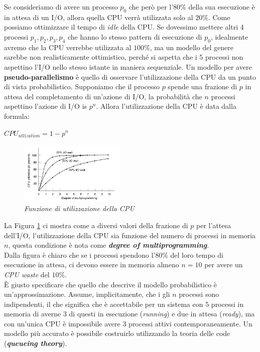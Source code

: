 Se consideriamo di avere un processo $p_0$ che però per l'$80\%$ della sua esecuzione è in attesa di un I/O, allora quella CPU verrà utilizzata solo al $20\%$. Come possiamo ottimizzare il tempo di \textit{idle} della CPU. Se dovessimo mettere altri 4 processi $p_1, p_2, p_3, p_4$ che hanno lo stesso pattern di esecuzione di $p_0$, idealmente avremo che la CPU verrebbe utilizzata al $100\%$, ma un modello del genere sarebbe non realisticamente ottimistico, perché si aspetta che i 5 processi non aspettino l'I/O nello stesso istante in maniera sequenziale. Un modello per avere \textbf{pseudo-parallelismo} è quello di osservare l'utilizzazione della CPU da un punto di vista probabilistico. Supponiamo che il processo $p$ spende una frazione di $p$ in attesa del completamento di un'azione di I/O, la probabilità che $n$ processi aspettino l'azione di I/O is $p^n$. Allora l'utilizzazione della CPU è data dalla formula:
\begin{center}
    $CPU_{utlization} = 1 - p^n$
\end{center}

\begin{figure}[h]
    \centering
    \includegraphics[width=0.45\textwidth]{img/deg_multiprog}
    \caption{\textit{Funzione di utilizzazione della CPU}}
    \label{fig:deg_multip}
\end{figure}

La Figura \ref{fig:deg_multip} ci mostra come a diversi valori della frazione di $p$ per l'attesa dell'I/O, l'utilizzazione della CPU sia funzione del numero di processi in memoria $n$, questa condizione è nota come \textbf{\textit{degree of multiprogramming}}. \\
Dalla figura è chiaro che se i processi spendono l'$80\%$ del loro tempo di esecuzione in attesa, ci devono essere in memoria almeno $n=10$ per avere un \textit{CPU waste} del $10\%$. \\
È giusto specificare che quello che descrive il modello probabilistico è un'approssimazione. Assume, implicitamente, che i gli $n$ processi sono indipendenti, il che significa che è accettabile per un sistema con 5 processi in memoria di averne 3 di questi in esecuzione (\textit{running}) e due in attesa (\textit{ready}), ma con un'unica CPU è impossibile avere 3 processi attivi contemporaneamente. Un modello più accurato è possibile costruirlo utilizzando la teoria delle code (\textbf{\textit{queueing theory}}).